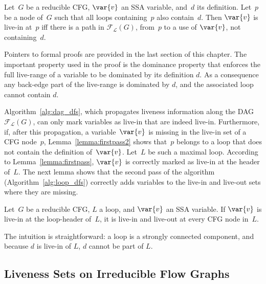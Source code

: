\begin{lemma}
	\label{lemma:firstpass2}
	Let~$G$ be a reducible CFG, $\var{v}$ an SSA variable, and~$d$ its definition.
	Let~$p$ be a node of~$G$ such that all loops containing~$p$ also contain~$d$.
	Then $\var{v}$ is live-in at~$p$ iff there is a path in $\mathcal{F}_\mathcal{L}(G)$, from~$p$ to a use of $\var{v}$, not containing~$d$.
\end{lemma}

Pointers to formal proofs are provided in the last section of this chapter.
The important property used in the proof is the dominance property that enforces the full live-range of a variable to be dominated by its definition $d$.
As a consequence any back-edge part of the live-range is dominated by $d$, and the associated loop cannot contain $d$.

Algorithm~\ref{alg:dag_dfs}, which propagates liveness information along the DAG $\mathcal{F}_\mathcal{L}(G)$, can only mark variables as live-in that are indeed live-in.
Furthermore, if, after this propagation, a variable~$\var{v}$ is missing in the live-in set of a CFG node~$p$, Lemma~\ref{lemma:firstpass2} shows that~$p$ belongs to a loop that does not contain the definition of~$\var{v}$.
Let~$L$ be such a maximal loop.
According to Lemma~\ref{lemma:firstpass}, $\var{v}$ is correctly marked as live-in at the header of~$L$.
The next lemma shows that the second pass of the algorithm (Algorithm~\ref{alg:loop_dfs}) correctly adds variables to the live-in and live-out sets where they are missing.

\begin{lemma}
	\label{lemma:secondpass}
	Let~$G$ be a reducible CFG, $L$ a loop, and $\var{v}$ an SSA variable.
	If $\var{v}$ is live-in at the loop-header of~$L$, it is live-in and live-out at every CFG node in~$L$.
\end{lemma}

The intuition is straightforward: a loop is a strongly connected component, and because $d$ is live-in of $L$, $d$ cannot be part of $L$. 


 \subsection{Liveness Sets on Irreducible Flow Graphs}
\label{sec:irreducible}

